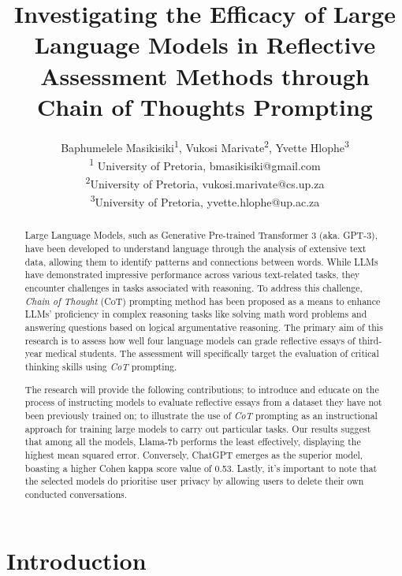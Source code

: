 \documentclass{article}
\title{Investigating the Efficacy of Large Language Models in Reflective Assessment Methods through Chain of Thoughts Prompting}
\author{Baphumelele Masikisiki\textsuperscript{1}, Vukosi Marivate\textsuperscript{2}, Yvette Hlophe\textsuperscript{3}  \\
\textsuperscript{1} University of Pretoria,  bmasikisiki@gmail.com \\
\textsuperscript{2}University of Pretoria,  vukosi.marivate@cs.up.za \\
\textsuperscript{3}University of Pretoria,  yvette.hlophe@up.ac.za}
\date{}
\begin{document}
\maketitle

\begin{abstract}
Large Language Models, such as Generative Pre-trained Transformer 3 (aka. GPT-3), have been developed to understand language through the analysis of extensive text data, allowing them to identify patterns and connections between words. While LLMs have demonstrated impressive performance across various text-related tasks, they encounter challenges in tasks associated with reasoning. To address this challenge, \textit{Chain of Thought} (CoT) prompting method has been proposed as a means to enhance LLMs' proficiency in complex reasoning tasks like solving math word problems and answering questions based on logical argumentative reasoning. The primary aim of this research is to assess how well four language models can grade reflective essays of third-year medical students. The assessment will specifically target the evaluation of critical thinking skills using \textit{ CoT} prompting.

The research will provide the following contributions; to introduce and educate on the process of instructing models to evaluate reflective essays from a dataset they have not been previously trained on; to illustrate the use of \textit{CoT} prompting as an instructional approach for training large models to carry out particular tasks. Our results suggest that among all the models, Llama-7b performs the least effectively, displaying the highest mean squared error. Conversely, {ChatGPT} emerges as the superior model, boasting a higher Cohen kappa score value of 0.53. Lastly, it's important to note that the selected models do prioritise user privacy by allowing users to delete their own conducted conversations.
\end{abstract}

\section{Introduction}
\end{document}
